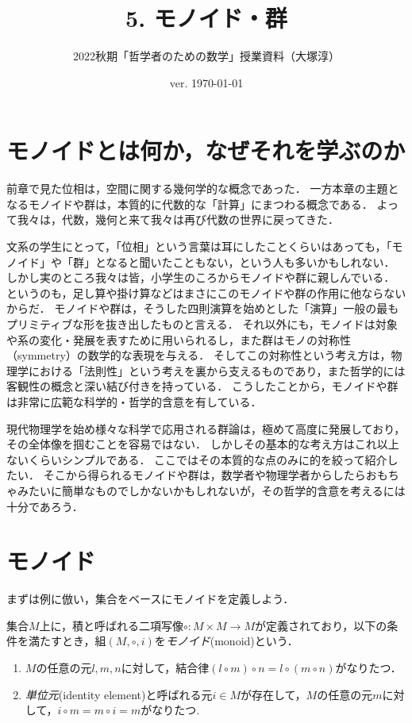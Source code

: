 \documentclass[11pt,a4paper]{jsarticle}
\begin{document}
\title{5. モノイド・群}
\author{2022秋期「哲学者のための数学」授業資料（大塚淳）}
\date{ver. \today}
\maketitle

\section{モノイドとは何か，なぜそれを学ぶのか}
前章で見た位相は，空間に関する幾何学的な概念であった．
一方本章の主題となるモノイドや群は，本質的に代数的な「計算」にまつわる概念である．
よって我々は，代数，幾何と来て我々は再び代数の世界に戻ってきた．

文系の学生にとって，「位相」という言葉は耳にしたことくらいはあっても，「モノイド」や「群」となると聞いたこともない，という人も多いかもしれない．
しかし実のところ我々は皆，小学生のころからモノイドや群に親しんでいる．
というのも，足し算や掛け算などはまさにこのモノイドや群の作用に他ならないからだ．
モノイドや群は，そうした四則演算を始めとした「演算」一般の最もプリミティブな形を抜き出したものと言える．
それ以外にも，モノイドは対象や系の変化・発展を表すために用いられるし，また群はモノの対称性（symmetry）の数学的な表現を与える．
そしてこの対称性という考え方は，物理学における「法則性」という考えを裏から支えるものであり，また哲学的には客観性の概念と深い結び付きを持っている．
こうしたことから，モノイドや群は非常に広範な科学的・哲学的含意を有している．

現代物理学を始め様々な科学で応用される群論は，極めて高度に発展しており，その全体像を掴むことを容易ではない．
しかしその基本的な考え方はこれ以上ないくらいシンプルである．
ここではその本質的な点のみに的を絞って紹介したい．
そこから得られるモノイドや群は，数学者や物理学者からしたらおもちゃみたいに簡単なものでしかないかもしれないが，その哲学的含意を考えるには十分であろう．

\section{モノイド}
まずは例に倣い，集合をベースにモノイドを定義しよう．

\begin{dfn}[モノイド]
集合$M$上に，積と呼ばれる二項写像$\circ: M \times M \to M$が定義されており，以下の条件を満たすとき，組$(M, \circ, i)$を\emph{モノイド}(monoid)という．
\begin{enumerate}
 \item $M$の任意の元$l, m, n$に対して，結合律$(l \circ m) \circ n = l \circ (m \circ n)$がなりたつ．
 \item \emph{単位元}(identity element)と呼ばれる元$i \in M$が存在して，$M$の任意の元$m$に対して，$i \circ m = m \circ i = m$がなりたつ.
\end{enumerate} 
\end{dfn}
\end{document}
